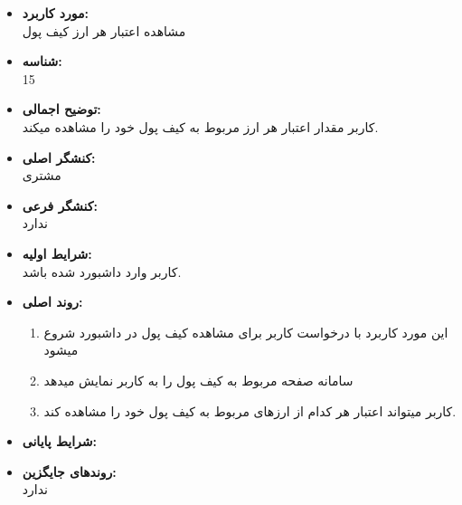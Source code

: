 \documentclass{article}
\begin{document}
\begin{itemize}
\item \textbf{مورد کاربرد:}\\
مشاهده اعتبار هر ارز کیف پول
\item \textbf{شناسه:}\\
15
\item \textbf{توضیح اجمالی:}\\
کاربر مقدار اعتبار هر ارز مربوط به کیف پول خود را مشاهده میکند.
\item \textbf{کنشگر اصلی:}\\
مشتری
\item \textbf{کنشگر فرعی:}\\
ندارد
\item \textbf{شرایط اولیه:}\\
کاربر وارد داشبورد  شده باشد.
\item \textbf{روند اصلی:}\\
\begin{enumerate}
\item  این مورد کاربرد با درخواست کاربر برای مشاهده کیف پول در داشبورد شروع میشود
\item سامانه صفحه  مربوط به کیف پول را به کاربر نمایش میدهد
\item کاربر میتواند اعتبار هر کدام از ارزهای مربوط به کیف پول خود را مشاهده کند.

\end{enumerate}
\item \textbf{شرایط پایانی:}\\ 
\item \textbf{روندهای جایگزین:}\\
ندارد
\end{itemize}
\noindent\makebox[\linewidth]{\rule{\paperwidth}{0.4pt}}
\end{document}
